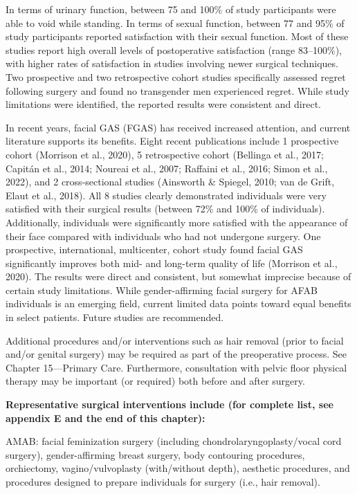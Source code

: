 \documentclass[
]{book}
\begin{document}
In terms of urinary function, between 75 and
100\% of study participants were able to void
while standing. In terms of sexual function,
between 77 and 95\% of study participants
reported satisfaction with their sexual function.
Most of these studies report high overall levels
of postoperative satisfaction (range 83--100\%),
with higher rates of satisfaction in studies involving newer surgical techniques. Two prospective
and two retrospective cohort studies specifically
assessed regret following surgery and found no
transgender men experienced regret. While study
limitations were identified, the reported results
were consistent and direct.

In recent years, facial GAS (FGAS) has received
increased attention, and current literature supports
its benefits. Eight recent publications include 1 prospective cohort (Morrison et al., 2020), 5 retrospective cohort (Bellinga et al., 2017; Capitán et al.,
2014; Noureai et al., 2007; Raffaini et al., 2016;
Simon et al., 2022), and 2 cross-sectional studies
(Ainsworth \& Spiegel, 2010; van de Grift, Elaut
et al., 2018). All 8 studies clearly demonstrated
individuals were very satisfied with their surgical
results (between 72\% and 100\% of individuals).
Additionally, individuals were significantly more
satisfied with the appearance of their face compared
with individuals who had not undergone surgery.
One prospective, international, multicenter, cohort
study found facial GAS significantly improves both
mid- and long-term quality of life (Morrison et al.,
2020). The results were direct and consistent, but
somewhat imprecise because of certain study limitations. While gender-affirming facial surgery for
AFAB individuals is an emerging field, current limited data points toward equal benefits in select
patients. Future studies are recommended.

Additional procedures and/or interventions
such as hair removal (prior to facial and/or genital surgery) may be required as part of the preoperative process. See Chapter 15---Primary Care.
Furthermore, consultation with pelvic floor physical therapy may be important (or required) both
before and after surgery.

\textbf{Representative surgical interventions include
(for complete list, see appendix E and the end
of this chapter):}

AMAB: facial feminization surgery (including
chondrolaryngoplasty/vocal cord surgery),
gender-affirming breast surgery, body contouring
procedures, orchiectomy, vagino/vulvoplasty
(with/without depth), aesthetic procedures, and
procedures designed to prepare individuals for
surgery (i.e., hair removal).
\end{document}
